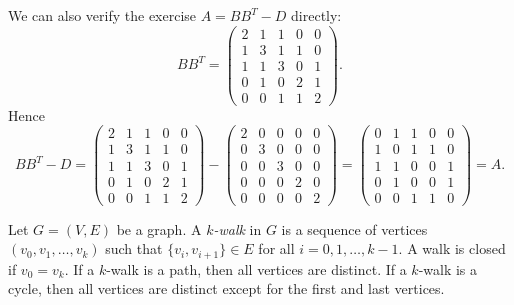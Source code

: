 \documentclass[11pt, a4paper]{ctexrep}
\begin{document}
\begin{example}
    We can also verify the exercise $A=BB^T-D$ directly:
    \[
        BB^T=
        \begin{pmatrix}
            2 & 1 & 1 & 0 & 0 \\
            1 & 3 & 1 & 1 & 0 \\
            1 & 1 & 3 & 0 & 1 \\
            0 & 1 & 0 & 2 & 1 \\
            0 & 0 & 1 & 1 & 2
        \end{pmatrix}.
    \]
    Hence
    \[
        BB^T-D=
        \begin{pmatrix}
            2 & 1 & 1 & 0 & 0 \\
            1 & 3 & 1 & 1 & 0 \\
            1 & 1 & 3 & 0 & 1 \\
            0 & 1 & 0 & 2 & 1 \\
            0 & 0 & 1 & 1 & 2
        \end{pmatrix}
        -
        \begin{pmatrix}
            2 & 0 & 0 & 0 & 0 \\
            0 & 3 & 0 & 0 & 0 \\
            0 & 0 & 3 & 0 & 0 \\
            0 & 0 & 0 & 2 & 0 \\
            0 & 0 & 0 & 0 & 2
        \end{pmatrix}
        =
        \begin{pmatrix}
            0 & 1 & 1 & 0 & 0 \\
            1 & 0 & 1 & 1 & 0 \\
            1 & 1 & 0 & 0 & 1 \\
            0 & 1 & 0 & 0 & 1 \\
            0 & 0 & 1 & 1 & 0
        \end{pmatrix}
        =A.
    \]

\end{example}

\begin{definition}[$ k $-walk]
    Let $ G=(V,E) $ be a graph. A \emph{$ k $-walk} in $ G $ is a sequence of vertices $(v_0,v_1,\dots,v_k)$ such that $\{v_i,v_{i+1}\} \in E$ for all $ i=0,1,\dots,k-1 $. A walk is closed if $ v_0=v_k $. If a $ k $-walk is a path, then all vertices are distinct. If a $ k $-walk is a cycle, then all vertices are distinct except for the first and last vertices.
\end{definition}
\end{document}
